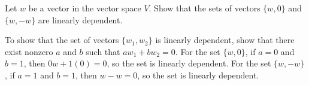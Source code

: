 \documentclass{ximera}
\begin{document}
\begin{exercise} \label{c5.4.1}
Let $w$ be a vector in the vector space $V$.  Show that the sets of vectors
$\{w,0\}$ and $\{w,-w\}$ are linearly dependent.

\begin{solution}

To show that the set of vectors $\{w_1,w_2\}$ is linearly dependent,
show that there exist nonzero $a$ and $b$ such that
$aw_1 + bw_2 = 0$.  For the set $\{w,0\}$, if $a = 0$ and $b = 1$,
then $0w + 1(0) = 0$, so the set is linearly dependent.  For the
set $\{w,-w\}$, if $a = 1$ and $b = 1$, then
$w - w = 0$, so the set is linearly dependent.

\end{solution}
\end{exercise}
\end{document}
